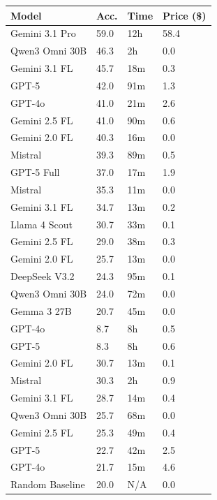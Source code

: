 \begin{tabular}{llll}
\toprule
Model & Acc. & Time & Price (\$) \\
\midrule
Gemini 3.1 Pro & 59.0 & 12h & 58.4 \\
Qwen3 Omni 30B & 46.3 & 2h & 0.0 \\
Gemini 3.1 FL & 45.7 & 18m & 0.3 \\
GPT-5 & 42.0 & 91m & 1.3 \\
GPT-4o & 41.0 & 21m & 2.6 \\
Gemini 2.5 FL & 41.0 & 90m & 0.6 \\
Gemini 2.0 FL & 40.3 & 16m & 0.0 \\
Mistral & 39.3 & 89m & 0.5 \\
GPT-5 Full & 37.0 & 17m & 1.9 \\
\midrule
Mistral & 35.3 & 11m & 0.0 \\
Gemini 3.1 FL & 34.7 & 13m & 0.2 \\
Llama 4 Scout & 30.7 & 33m & 0.1 \\
Gemini 2.5 FL & 29.0 & 38m & 0.3 \\
Gemini 2.0 FL & 25.7 & 13m & 0.0 \\
DeepSeek V3.2 & 24.3 & 95m & 0.1 \\
Qwen3 Omni 30B & 24.0 & 72m & 0.0 \\
Gemma 3 27B & 20.7 & 45m & 0.0 \\
GPT-4o & 8.7 & 8h & 0.5 \\
GPT-5 & 8.3 & 8h & 0.6 \\
\midrule
Gemini 2.0 FL & 30.7 & 13m & 0.1 \\
Mistral & 30.3 & 2h & 0.9 \\
Gemini 3.1 FL & 28.7 & 14m & 0.4 \\
Qwen3 Omni 30B & 25.7 & 68m & 0.0 \\
Gemini 2.5 FL & 25.3 & 49m & 0.4 \\
GPT-5 & 22.7 & 42m & 2.5 \\
GPT-4o & 21.7 & 15m & 4.6 \\
\midrule
Random Baseline & 20.0 & N/A & 0.0 \\
\bottomrule
\end{tabular}
